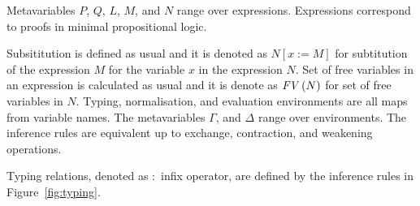 \documentclass[11p,a4paper]{article}
\newcommand{\sbs}[3]{#1[#2:=#3]}
\newcommand{\fv}[1]{\txt{FV}\,(#1)}
\newcommand{\txt}[1]{\text{\emph{#1}}}
\begin{document}
Metavariables $P$, $Q$, $L$, $M$, and $N$ range over
expressions. Expressions correspond to proofs in minimal propositional
logic. 


Subsititution is defined as usual and it is denoted as
$\sbs{N}{x}{M}$ for subtitution of the expression $M$ for the
variable $x$ in the expression $N$. Set of free variables in an
expression is calculated as usual and it is denote as $\fv{N}$ for
set of free variables in $N$.
Typing, normalisation, and evaluation environments are all maps from
variable names. The metavariables $\Gamma$, and $\Delta$ range over
environments.  The inference rules are equivalent up to exchange,
contraction, and weakening operations.

Typing relations, denoted as $:$ infix operator, are defined by
the inference rules in Figure~\ref{fig:typing}.
\end{document}

